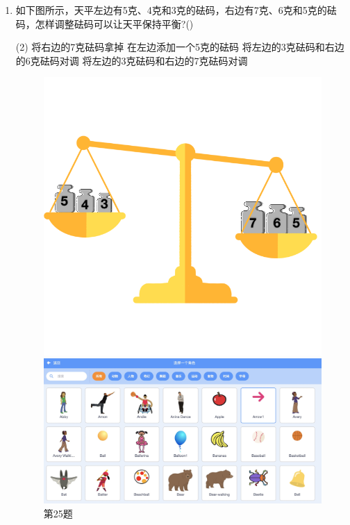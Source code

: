 \documentclass[10pt, a4paper]{article}
\begin{document}
\begin{enumerate}
        \item 如下图所示，天平左边有5克、4克和3克的砝码，右边有7克、6克和5克的砝码，怎样调整砝码可以让天平保持平衡?(\qquad)
        \begin{tasks}(2)
            \task 将右边的7克砝码拿掉
            \task 在左边添加一个5克的砝码
            \task 将左边的3克砝码和右边的6克砝码对调
            \task 将左边的3克砝码和右边的7克砝码对调
        \end{tasks}

        \begin{figure}[htbp]
            \centering
            \begin{minipage}[t]{.23\textwidth}
                \centering
                \includegraphics[width=\textwidth]{25.png}
                \caption*{第25题}
            \end{minipage}
            \begin{minipage}[t]{.33\textwidth}
                \centering
                \includegraphics[width=\textwidth]{29.jpg}

\end{minipage}
\end{figure}
\end{enumerate}
\end{document}
